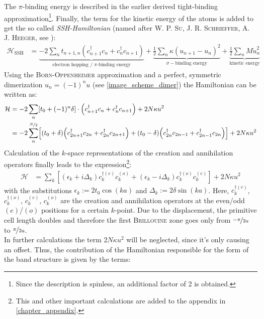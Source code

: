 The $\pi$-binding energy is described in the earlier derived tight-binding approximation\footnote{Since the description is spinless, an additional factor of 2 is obtained.}. Finally, the term for the kinetic energy of the atoms is added to get the so called \emph{SSH-Hamiltonian} (named after \textsc{W. P. Su, J. R. Schrieffer, A. J. Heeger}, see \cite{PhysRevB.22.2099, RevModPhys.60.781}):
\begin{align}
	\mathcal{H}_\text{SSH} &= \underbrace{-2\sum_{n} t_{n+1,n}\left(c_{n+1}^\dagger c_n + c_n^\dagger c_{n+1}\right)}_{\text{electron hopping / $\pi$-binding energy}} +
	\underbrace{\frac{1}{2}\sum_n \kappa (u_{n+1} - u_n)^2}_{\sigma-\text{binding energy}} + 
	\underbrace{\frac{1}{2} \sum_n M \dot{u}^2_n}_{\text{kinetic energy}}
\end{align}
\newpage Using the \textsc{Born-Oppenheimer} approximation and a perfect, symmetric dimerization $u_n = (-1)^nu$ (see \cref{image_scheme_dimer}) the Hamiltonian can be written as:
\begin{align}
	\mathcal{H} &= -2\sum_n \left[t_0 + (-1)^n\delta\right]\cdot\left(c_{n+1}^\dagger c_n + c_n^\dagger c_{n+1}\right) + 2N\kappa u^2\\
	&= -2\sum_n^{\nicefrac{N}{2}} \left[\left(t_0+\delta\right)\left(c_{2n+1}^\dagger c_{2n} + c_{2n}^\dagger c_{2n+1} \right) + 
	\left(t_0-\delta\right)\left(c_{2n}^\dagger c_{2n-1} + c_{2n-1}^\dagger c_{2n} \right)\right]+2N\kappa u^2
	\label{equation_SSH_hamiltonian_real_space}
\end{align}
Calculation of the $k$-space representations of the creation and annihilation operators finally leads to the expression\footnote{This and other important calculations are added to the appendix in \cref{chapter_appendix}.}:
\begin{align}
\mathcal{H} &= \sum_k \left[
\left(\epsilon_k + i\Delta_k\right)c_{k}^{\dagger(e)}c_{k}^{(o)} + \left(\epsilon_k-i\Delta_k \right)	c_{k}^{\dagger(o)}c_{k}^{(e)}\right] + 2N\kappa u^2
\end{align}
with the substitutions $\epsilon_k := 2t_0\cos(ka)$ and $\Delta_k := 2\delta\sin(ka)$. Here, $c^{\dagger(e)}_k$, $c^{\dagger(o)}_k$, $c^{(e)}_k$, $c^{(o)}_k$ are the creation and annihilation operators at the even/odd $(e)$/$(o)$ positions for a certain $k$-point. Due to the displacement, the primitive cell length doubles and therefore the first \textsc{Brillouine} zone goes only from $\nicefrac{-\pi}{2a}$ to $\nicefrac{\pi}{2a}$.\\
In further calculations the term $2N\kappa u^2$ will be neglected, since it's only causing an offset. Thus, the contribution of the Hamiltonian responsible for the form of the band structure is given by the terms:
